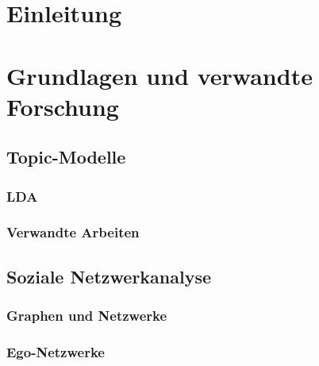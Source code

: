 \documentclass[11pt,a4paper,twoside]{article}
\begin{document}
{
\setcounter{tocdepth}{3}
\tableofcontents
}
\cleardoublepage

\setcounter{page}{1}

\fancyhead[LE,RO]{\rightmark}
\fancyhead[LO,RE]{\leftmark}
\fancyfoot[LE,RO]{\thepage}

\cleardoublepage

\hypertarget{einleitung}{%
\section{Einleitung}\label{einleitung}}

\cleardoublepage

\hypertarget{grundlagen-und-verwandte-forschung}{%
\section{Grundlagen und verwandte
Forschung}\label{grundlagen-und-verwandte-forschung}}

\hypertarget{topic-modelle}{%
\subsection{Topic-Modelle}\label{topic-modelle}}

\hypertarget{lda}{%
\subsubsection{LDA}\label{lda}}

\hypertarget{verwandte-arbeiten}{%
\subsubsection{Verwandte Arbeiten}\label{verwandte-arbeiten}}

\hypertarget{soziale-netzwerkanalyse}{%
\subsection{Soziale Netzwerkanalyse}\label{soziale-netzwerkanalyse}}

\hypertarget{graphen-und-netzwerke}{%
\subsubsection{Graphen und Netzwerke}\label{graphen-und-netzwerke}}

\hypertarget{ego-netzwerke}{%
\subsubsection{Ego-Netzwerke}\label{ego-netzwerke}}
\end{document}
